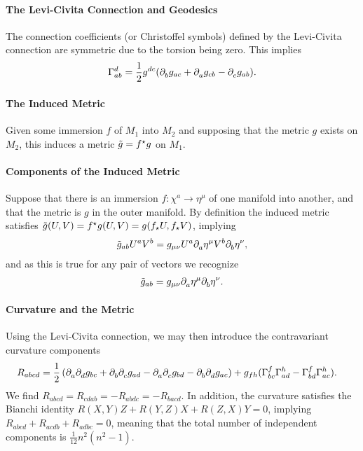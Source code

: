 \paragraph{The Levi-Civita Connection and Geodesics}
The connection coefficients (or Christoffel symbols) defined by the Levi-Civita connection are symmetric due to the torsion being zero. This implies
\begin{align*}
	\chris{d}{a}{b} = \frac{1}{2}g^{dc}(\del{b}{g_{ac}} + \del{a}{g_{cb}} - \del{c}{g_{ab}}).
\end{align*}

\paragraph{The Induced Metric}
Given some immersion $f$ of $M_{1}$ into $M_{2}$ and supposing that the metric $g$ exists on $M_{2}$, this induces a metric $\tilde{g} = f^{\star}g$ on $M_{1}$.

\paragraph{Components of the Induced Metric}
Suppose that there is an immersion $f: \chi^{a}\to\eta^{\mu}$ of one manifold into another, and that the metric is $g$ in the outer manifold. By definition the induced metric satisfies $\tilde{g}(U, V) = f^{\star}g(U, V) = g(f_{\star}U, f_{\star}V)$, implying
\begin{align*}
	\tilde{g}_{ab}U^{a}V^{b} = g_{\mu\nu}U^{a}\partial^{}_{a}\eta^{\mu}V^{b}\partial^{}_{b}\eta^{\nu},
\end{align*}
and as this is true for any pair of vectors we recognize
\begin{align*}
	\tilde{g}_{ab} = g_{\mu\nu}\partial^{}_{a}\eta^{\mu}\partial^{}_{b}\eta^{\nu}.
\end{align*}

\paragraph{Curvature and the Metric}
Using the Levi-Civita connection, we may then introduce the contravariant curvature components
\begin{align*}
	R_{abcd} &= \frac{1}{2}\left(\del{a}{\del{d}{g_{bc}}} + \del{b}{\del{c}{g_{ad}}} - \del{a}{\del{c}{g_{bd}}} - \del{b}{\del{d}{g_{ac}}}\right) + g_{fh}(\chris{f}{b}{c}\chris{h}{a}{d} - \chris{f}{b}{d}\chris{h}{a}{c}).
\end{align*}
We find $R_{abcd} = R_{cdab} = -R_{abdc} = -R_{bacd}$. In addition, the curvature satisfies the Bianchi identity $R(X, Y)Z + R(Y, Z)X + R(Z, X)Y = 0$, implying $R_{abcd} + R_{acdb} + R_{adbc} = 0$, meaning that the total number of independent components is $\frac{1}{12}n^{2}(n^{2} - 1)$.

